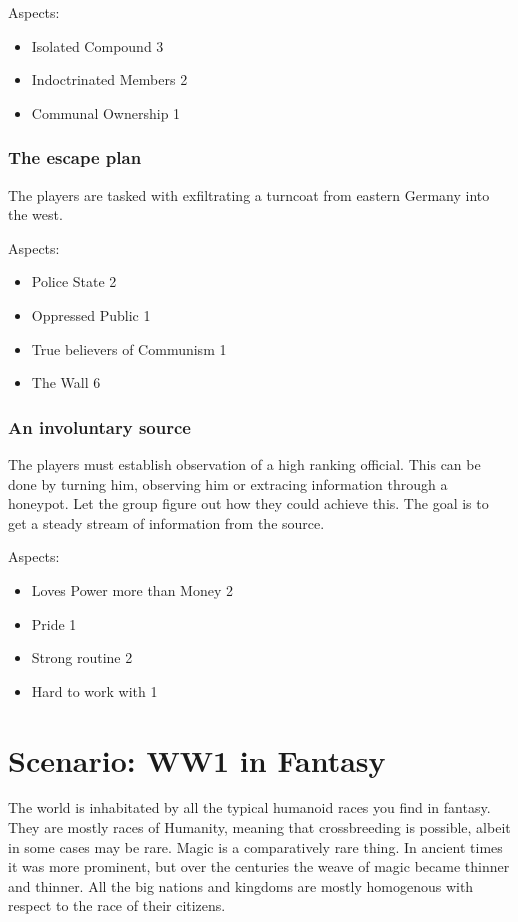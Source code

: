 \documentclass[11pt]{article}
\begin{document}
{Aspects:
\begin{itemize}
\item Isolated Compound 3
\item Indoctrinated Members 2
\item Communal Ownership 1
\end{itemize}


\subsubsection{The escape plan}
\label{sec:org7485824}

The players are tasked with exfiltrating a turncoat from eastern Germany into the west.

Aspects:
\begin{itemize}
\item Police State 2
\item Oppressed Public 1
\item True believers of Communism 1
\item The Wall 6
\end{itemize}

\subsubsection{An involuntary source}
\label{sec:orgb28f18d}

The players must establish observation of a high ranking official. This can be done by turning him, observing him or extracing information through a honeypot. Let the group figure out how they could achieve this. The goal is to get a steady stream of information from the source.

Aspects:
\begin{itemize}
\item Loves Power more than Money 2
\item Pride 1
\item Strong routine 2
\item Hard to work with 1
\end{itemize}

\section{Scenario: WW1 in Fantasy}
\label{sec:org0009a13}

The world is inhabitated by all the typical humanoid races you find in fantasy. They are mostly races of Humanity, meaning that crossbreeding is possible, albeit in some cases may be rare. Magic is a comparatively rare thing. In ancient times it was more prominent, but over the centuries the weave of magic became thinner and thinner. All the big nations and kingdoms are mostly homogenous with respect to the race of their citizens. 

}
\end{document}
